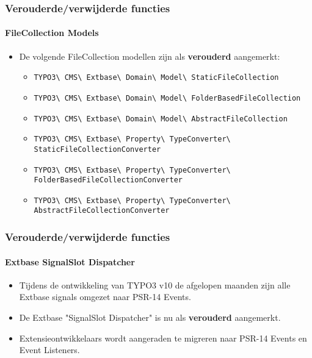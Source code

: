 \begin{frame}[fragile]
	\frametitle{Verouderde/verwijderde functies}
	\framesubtitle{FileCollection Models}

	\begin{itemize}
		\item De volgende FileCollection modellen zijn als \textbf{verouderd} aangemerkt:
			\vspace{0.4cm}
			\begin{itemize}\tiny
				\item \texttt{TYPO3\textbackslash
					CMS\textbackslash
					Extbase\textbackslash
					Domain\textbackslash
					Model\textbackslash
					StaticFileCollection}

				\item \texttt{TYPO3\textbackslash
					CMS\textbackslash
					Extbase\textbackslash
					Domain\textbackslash
					Model\textbackslash
					FolderBasedFileCollection}

				\item \texttt{TYPO3\textbackslash
					CMS\textbackslash
					Extbase\textbackslash
					Domain\textbackslash
					Model\textbackslash
					AbstractFileCollection}

				\item \texttt{TYPO3\textbackslash
					CMS\textbackslash
					Extbase\textbackslash
					Property\textbackslash
					TypeConverter\textbackslash
					StaticFileCollectionConverter}

				\item \texttt{TYPO3\textbackslash
					CMS\textbackslash
					Extbase\textbackslash
					Property\textbackslash
					TypeConverter\textbackslash
					FolderBasedFileCollectionConverter}

				\item \texttt{TYPO3\textbackslash
					CMS\textbackslash
					Extbase\textbackslash
					Property\textbackslash
					TypeConverter\textbackslash
					AbstractFileCollectionConverter}

			\end{itemize}

	\end{itemize}

\end{frame}


\begin{frame}[fragile]
	\frametitle{Verouderde/verwijderde functies}
	\framesubtitle{Extbase SignalSlot Dispatcher}

	\begin{itemize}
		\item Tijdens de ontwikkeling van TYPO3 v10 de afgelopen maanden
			zijn alle Extbase signals omgezet naar PSR-14 Events.
		\item De Extbase "SignalSlot Dispatcher" is nu als \textbf{verouderd} aangemerkt.
		\item Extensieontwikkelaars wordt aangeraden te migreren naar PSR-14 Events en Event Listeners.
	\end{itemize}

\end{frame}

